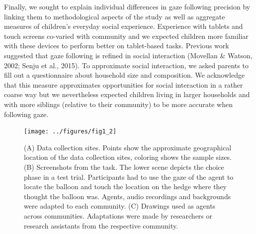 \documentclass[
  man,floatsintext]{apa7}
\begin{document}
Finally, we sought to explain individual differences in gaze following precision by linking them to methodological aspects of the study as well as aggregate measures of children's everyday social experience. Experience with tablets and touch screens co-varied with community and we expected children more familiar with these devices to perform better on tablet-based tasks. Previous work suggested that gaze following is refined in social interaction (Movellan \& Watson, 2002; Senju et al., 2015). To approximate social interaction, we asked parents to fill out a questionnaire about household size and composition. We acknowledge that this measure approximates opportunities for social interaction in a rather coarse way but we nevertheless expected children living in larger households and with more siblings (relative to their community) to be more accurate when following gaze.

\begin{figure}
\texttt{[image: ../figures/fig1\_2]} \caption{(A) Data collection sites. Points show the approximate geographical location of the data collection sites, coloring shows the sample sizes. (B) Screenshots from the task. The lower scene depicts the choice phase in a test trial. Participants had to use the gaze of the agent to locate the balloon and touch the location on the hedge where they thought the balloon was. Agents, audio recordings and backgrounds were adapted to each community. (C) Drawings used as agents across communities. Adaptations were made by researchers or research assistants from the respective community.}\label{fig:fig1}
\end{figure}
\end{document}
